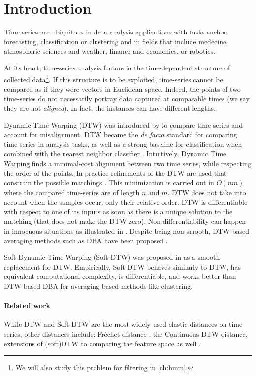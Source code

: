 \section{Introduction}

Time-series are ubiquitous in data analysis applications with tasks such as forecasting, classification or clustering and in fields that include medecine, atmospheric sciences and weather, finance and economics, or robotics.

At its heart, time-series analysis factors in the time-dependent structure of collected data\footnote{We will also study this problem for filtering in \cref{ch:hmm}.}. If this structure is to be exploited, time-series cannot be compared as if they were vectors in Euclidean space. Indeed, the points of two time-series do not necessarily portray data captured at comparable times (we say they are not \emph{aligned}). In fact, the instances can have different lengths.

Dynamic Time Warping (DTW) was introduced by \cite{dtw} to compare time series and account for misalignment. DTW became the \emph{de facto} standard for comparing time series in analysis tasks, as well as a strong baseline for classification when combined with the nearest neighbor classifier \citep{dtw-baseline-1, dtw-baseline-2}. Intuitively, Dynamic Time Warping finds a minimal-cost alignment between two time series, while respecting the order of the points. In practice refinements of the DTW are used that constrain the possible matchings \citep{dtw-baseline-1}. This minimization is carried out in $O(nm)$ where the compared time-series are of length $n$ and $m$. DTW does not take into account when the samples occur, only their relative order. DTW is differentiable with respect to one of its inputs as soon as there is a unique solution to the matching (that does not make the DTW zero). Non-differentiability can happen in innocuous situations as illustrated in \cite{tavenard-dtw-diff}. Despite being non-smooth, DTW-based averaging methods such as DBA have been proposed \citep{dba-petitjean}.

Soft Dynamic Time Warping (Soft-DTW) was proposed in \cite{soft-dtw} as a smooth replacement for DTW. Empirically, Soft-DTW behaves similarly to DTW, has equivalent computational complexity, is differentiable, and works better than DTW-based DBA for averaging based methods like clustering.

\paragraph{Related work}
While DTW and Soft-DTW are the most widely used elastic distances on time-series, other distances include: Fréchet distance \citep{frechet-clustering}, the Continuous-DTW distance\citep{cdtw}, extensions of (soft)DTW to comparing the feature space as well \citep{align-incomparable,vayer2022time}.

